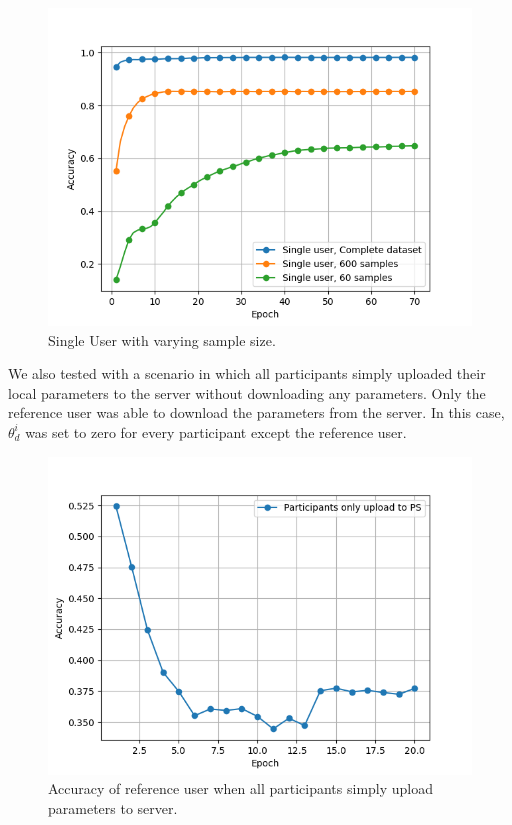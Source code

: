 \documentclass[letterpaper]{article}
\begin{document}
\begin{flushleft}
{\begin{figure}[H]
  \centering
    \includegraphics[width=5in]{SingleUserBaselinesGrid.png}
    \caption[Accuracy of single user with varying sample size.]{\label{fig:SingleUser} Single User with varying sample size.}
  \end{figure}




We also tested with a scenario in which all participants simply uploaded their local parameters to the server without downloading any parameters. Only the reference user was able to download the parameters from the server. In this case, $\theta_d^i$ was set to zero for every participant except the reference user.


\begin{figure}[H]
  \centering
    \includegraphics[width=5in]{AllUploadNoDownloadGrid.png}
    \caption[Accuracy graph where all participants upload.]{\label{fig:AllUploadNoDownloadGrid} Accuracy of reference user when all participants simply upload parameters to server.}
  \end{figure}


}
\end{flushleft}
\end{document}
